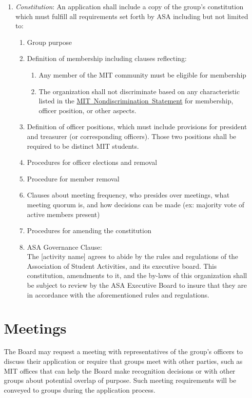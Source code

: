 \documentclass[12pt]{constitution}
\newcommand{\NDS}{\href{https://handbook.mit.edu/nondiscrimination}{MIT~Nondiscrimination~Statement}\xspace}
\begin{document}
\begin{enumerate}
    \item \textit{Constitution}: An application shall include a copy of the group's constitution which must fulfill
        all requirements set forth by ASA including but not limited to:
    \begin{enumerate}
        \item Group purpose
        \item Definition of membership including clauses reflecting:
        \begin{enumerate}
            \item Any member of the MIT community must be eligible for membership
            \item The organization shall not discriminate based on any characteristic listed in the
                \NDS for membership, officer position, or other aspects.
        \end{enumerate}
    \item Definition of officer positions, which must include provisions for president and
        treasurer (or corresponding officers).
    Those two positions shall be required to be distinct MIT students.
    \item Procedures for officer elections and removal
    \item Procedure for member removal
    \item Clauses about meeting frequency, who presides over meetings, what meeting quorum is,
        and how decisions can be made (ex: majority vote of active members present)
    \item Procedures for amending the constitution
    \item ASA Governance Clause:\\
        The [activity name] agrees to abide by the rules and regulations of the Association of
            Student Activities, and its executive board.
        This constitution, amendments to it, and the by-laws of this organization shall be subject
            to review by the ASA Executive Board to insure that they are in accordance with the
            aforementioned rules and regulations.
    \end{enumerate}
\end{enumerate}

\section{Meetings}
The Board may request a meeting with representatives of the group's officers to discuss their
    application or require that groups meet with other parties, such as MIT offices that can help the
    Board make recognition decisions or with other groups about potential overlap of purpose.
Such meeting requirements will be conveyed to groups during the application process.
\end{document}
